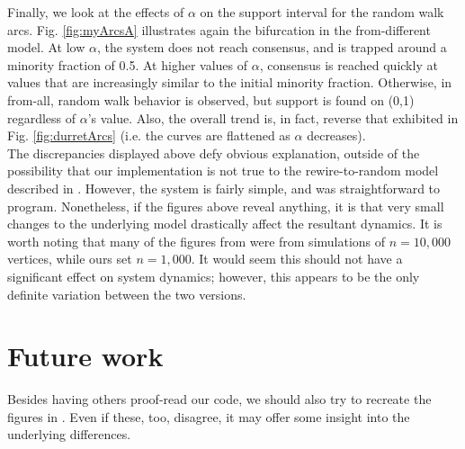\documentclass[11pt]{article}
\begin{document}
Finally, we look at the effects of $\alpha$ on the support interval for the random walk arcs. Fig. \ref{fig:myArcsA} illustrates again the bifurcation in the from-different model. At low $\alpha$, the system does not reach consensus, and is trapped around a minority fraction of 0.5. At higher values of $\alpha$, consensus is reached quickly at values that are increasingly similar to the initial minority fraction. Otherwise, in from-all, random walk behavior is observed, but support is found on (0,1) regardless of $\alpha$'s value. Also, the overall trend is, in fact, reverse that exhibited in Fig. \ref{fig:durretArcs} (i.e. the curves are flattened as $\alpha$ decreases).\\[1pt]
\indent The discrepancies displayed above defy obvious explanation, outside of the possibility that our implementation is not true to the rewire-to-random model described in \cite{durret:pnas12}. However, the system is fairly simple, and was straightforward to program. Nonetheless, if the figures above reveal anything, it is that very small changes to the underlying model drastically affect the resultant dynamics. It is worth noting that many of the figures from \cite{durret:pnas12} were from simulations of $n=10,000$ vertices, while ours set $n=1,000$. It would seem this should not have a significant effect on system dynamics; however, this appears to be the only definite variation between the two versions.

\section*{Future work}
Besides having others proof-read our code, we should also try to recreate the figures in \cite{vazquez:prl08}. Even if these, too, disagree, it may offer some insight into the underlying differences.



\end{document}
